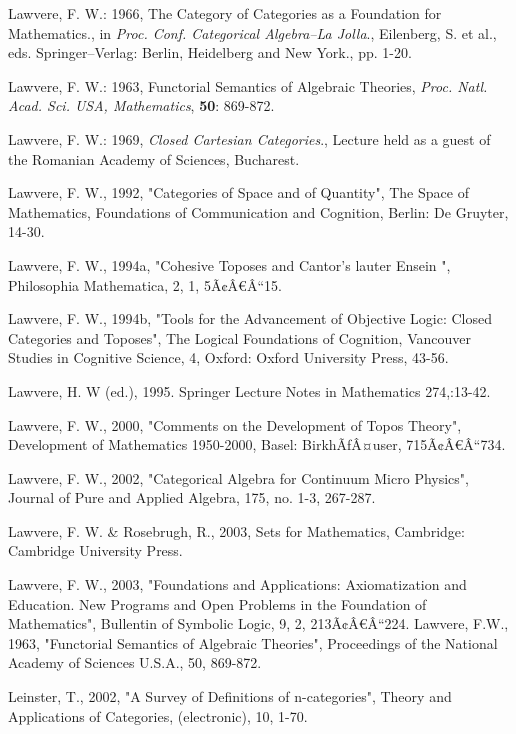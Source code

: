 \documentclass[12pt]{article}
\begin{document}
\begin{thebibliography}{199}
Lawvere, F. W.: 1966, The Category of Categories as a Foundation for Mathematics., in
\emph{Proc. Conf. Categorical Algebra--La Jolla}., Eilenberg, S. et al., eds. Springer--Verlag:
Berlin, Heidelberg and New York., pp. 1-20.

Lawvere, F. W.: 1963, Functorial Semantics of Algebraic Theories,
\emph{Proc. Natl. Acad. Sci. USA, Mathematics}, \textbf{50}: 869-872.

Lawvere, F. W.: 1969, \emph{Closed Cartesian Categories}., Lecture held as a guest of the
Romanian Academy of Sciences, Bucharest.

Lawvere, F. W., 1992, "Categories of Space and of Quantity", The Space of Mathematics, Foundations of Communication and Cognition, Berlin: De Gruyter, 14-30.  

Lawvere, F. W., 1994a, "Cohesive Toposes and Cantor's lauter Ensein ", Philosophia Mathematica, 2, 1, 5Ã¢Â€Â“15. 

Lawvere, F. W., 1994b, "Tools for the Advancement of Objective Logic: Closed Categories and Toposes", The Logical Foundations of Cognition, Vancouver Studies in Cognitive Science, 4, Oxford: Oxford University Press, 43-56.  

Lawvere, H. W (ed.), 1995. Springer Lecture Notes in Mathematics 274,:13-42. 

Lawvere, F. W., 2000, "Comments on the Development of Topos Theory", Development of Mathematics 1950-2000, Basel: BirkhÃƒÂ¤user, 715Ã¢Â€Â“734. 

Lawvere, F. W., 2002, "Categorical Algebra for Continuum Micro Physics", Journal of Pure and Applied Algebra, 175, no. 1-3, 267-287. 

Lawvere, F. W. \& Rosebrugh, R., 2003, Sets for Mathematics, Cambridge: Cambridge University Press.  

Lawvere, F. W., 2003, "Foundations and Applications: Axiomatization and Education. New Programs and Open Problems in the Foundation of Mathematics", Bullentin of Symbolic Logic, 9, 2, 213Ã¢Â€Â“224. 
Lawvere, F.W., 1963, "Functorial Semantics of Algebraic Theories", Proceedings of the National Academy of Sciences U.S.A., 50, 869-872. 

Leinster, T., 2002, "A Survey of Definitions of n-categories", Theory and Applications of Categories, (electronic), 10, 1-70. 


\end{thebibliography}
\end{document}
